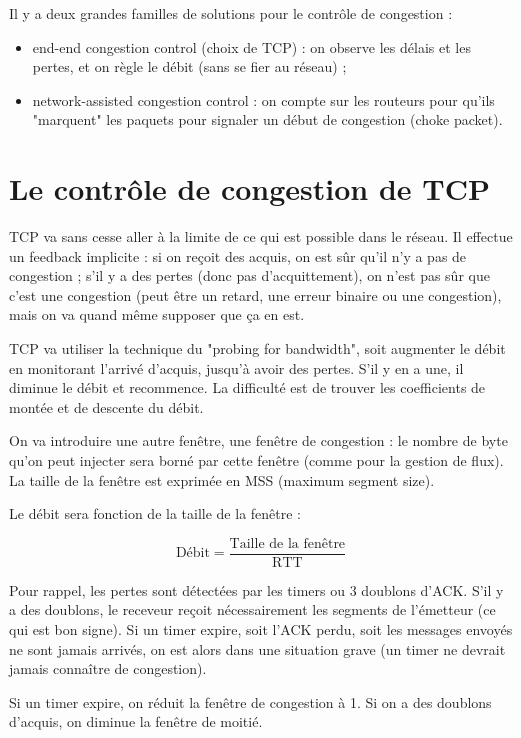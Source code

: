 	Il y a deux grandes familles de solutions pour le contrôle de congestion :

	\begin{itemize}
		\item end-end congestion control (choix de TCP) : on observe les délais et les pertes, et on règle le débit (sans se fier au réseau) ;
		\item network-assisted congestion control : on compte sur les routeurs pour qu'ils "marquent" les paquets pour signaler un début de congestion (choke packet).
	\end{itemize}


\section{Le contrôle de congestion de TCP}

TCP va sans cesse aller à la limite de ce qui est possible dans le réseau. Il effectue un feedback implicite : si on reçoit des acquis, on est sûr qu'il n'y a pas de congestion ; s'il y a des pertes (donc pas d'acquittement), on n'est pas sûr que c'est une congestion (peut être un retard, une erreur binaire ou une congestion), mais on va quand même supposer que ça en est.


TCP va utiliser la technique du "probing for bandwidth", soit augmenter le débit en monitorant l'arrivé d'acquis, jusqu'à avoir des pertes. S'il y en a une, il diminue le débit et recommence. La difficulté est de trouver les coefficients de montée et de descente du débit.


On va introduire une autre fenêtre, une fenêtre de congestion : le nombre de byte qu'on peut injecter sera borné par cette fenêtre (comme pour la gestion de flux). La taille de la fenêtre est exprimée en MSS (maximum segment size).

Le débit sera fonction de la taille de la fenêtre :

$$\text{Débit} = \frac{\text{Taille de la fenêtre}}{\text{RTT}}$$

Pour rappel, les pertes sont détectées par les timers ou 3 doublons d'ACK. S'il y a des doublons, le receveur reçoit nécessairement les segments de l'émetteur (ce qui est bon signe). Si un timer expire, soit l'ACK perdu, soit les messages envoyés ne sont jamais arrivés, on est alors dans une situation grave (un timer ne devrait jamais connaître de congestion).

Si un timer expire, on réduit la fenêtre de congestion à 1. Si on a des doublons d'acquis, on diminue la fenêtre de moitié.


